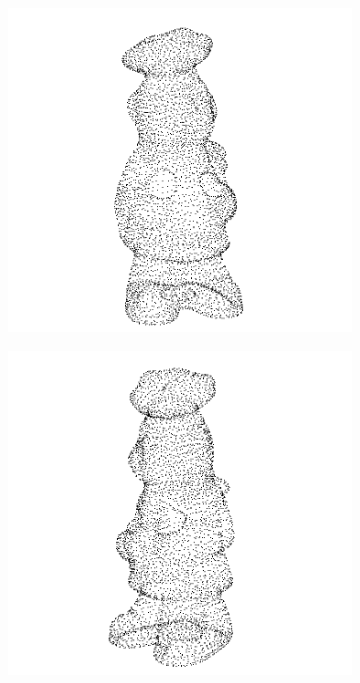 \begin{figure}[t]
	\centering
	\begin{subfigure}[b]{0.4\textwidth}
		\includegraphics[width=\textwidth]{img/ejemplos_nubes/chef_01.png}
	\end{subfigure}
	\quad
	\begin{subfigure}[b]{0.4\textwidth}
		\includegraphics[width=\textwidth]{img/ejemplos_nubes/chef_02.png}
	\end{subfigure}


\end{figure}
